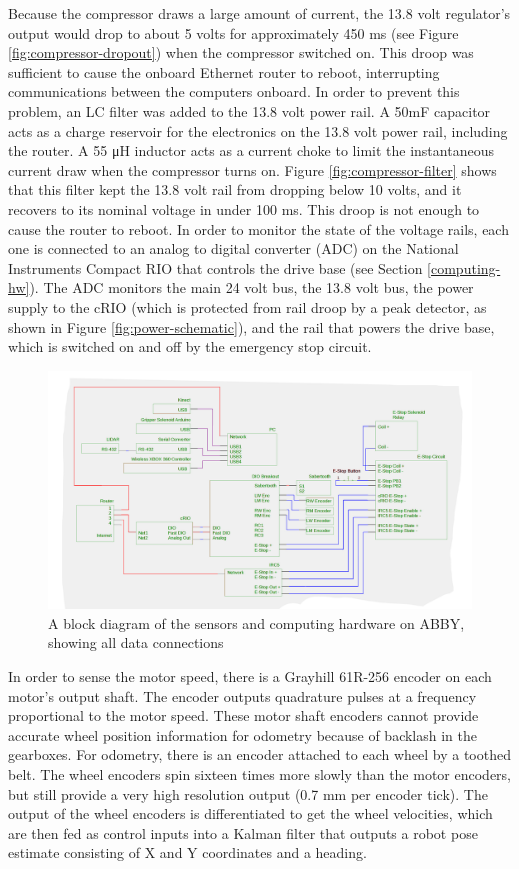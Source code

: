\documentclass[]{cwru} %
\begin{document}
Because the compressor draws a large amount of current, the 13.8 volt
regulator's output would drop to about 5 volts for approximately 450 ms
(see Figure \ref{fig:compressor-dropout}) when the compressor switched on. This droop was
sufficient to cause the onboard Ethernet router to reboot, interrupting
communications between the computers onboard. In order to prevent this
problem, an LC filter was added to the 13.8 volt power rail. A 50mF
capacitor acts as a charge reservoir for the electronics on the 13.8
volt power rail, including the router. A 55 μH inductor acts as a
current choke to limit the instantaneous current draw when the
compressor turns on. Figure \ref{fig:compressor-filter} shows that this filter kept the 13.8 volt
rail from dropping below 10 volts, and it recovers to its nominal
voltage in under 100 ms. This droop is not enough to cause the router to
reboot. In order to monitor the state of the voltage rails, each one is
connected to an analog to digital converter (ADC) on the National
Instruments Compact RIO that controls the drive base (see Section \ref{computing-hw}).
The ADC monitors the main 24 volt bus, the 13.8 volt bus, the power
supply to the cRIO (which is protected from rail droop by a peak
detector, as shown in Figure \ref{fig:power-schematic}), and the rail that powers the drive
base, which is switched on and off by the emergency stop circuit.

\begin{figure}[h]
\centering
\includegraphics[width=6.0in]{data_block_diagram}
\caption{A block diagram of the sensors and computing hardware on ABBY, 
showing all data connections}
\label{fig:data-schematic}
\end{figure}

In order to sense the motor speed, there is a Grayhill 61R-256 encoder
on each motor's output shaft. The encoder outputs quadrature pulses at a
frequency proportional to the motor speed. These motor shaft encoders
cannot provide accurate wheel position information for odometry because
of backlash in the gearboxes. For odometry, there is an encoder attached
to each wheel by a toothed belt. The wheel encoders spin sixteen times
more slowly than the motor encoders, but still provide a very high
resolution output (0.7 mm per encoder tick). The output of the wheel
encoders is differentiated to get the wheel velocities, which are then
fed as control inputs into a Kalman filter that outputs a robot pose
estimate consisting of X and Y coordinates and a heading.
\end{document}
